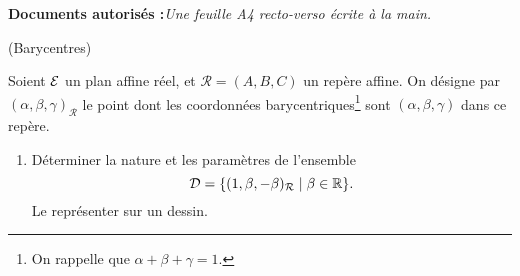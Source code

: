\documentclass[a4paper,12pt,reqno]{amsart}
\begin{document}
\ifsolutions\else
\textbf{Documents autorisés :}\textit{Une feuille A4 recto-verso écrite à la main.}
\tsvp
\vspace*{\fill}
\fi


\begin{exo} (Barycentres)

  Soient $\mathcal{E}$ un plan affine réel, et $\mathcal{R}= (A,B,C)$ un repère affine. On désigne par $(\alpha, \beta, \gamma)_{\mathcal{R}}$ le point dont les coordonnées barycentriques\footnote{On rappelle que $\alpha + \beta + \gamma = 1$.} sont $(\alpha, \beta, \gamma)$ dans ce repère.
  \begin{enumerate}
    \item Déterminer la nature et les paramètres de l'ensemble
      $$
        \mathcal{D} = \{(1,\beta,-\beta)_{\mathcal{R}} \mid \beta\in \mathbb{R}\}.
      $$
      Le représenter sur un dessin.


\end{enumerate}
\end{exo}
\end{document}

